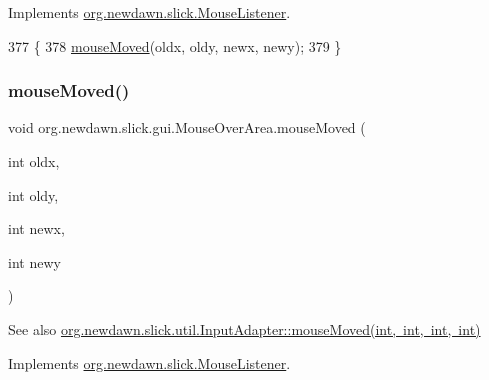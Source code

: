 Implements \mbox{\hyperlink{interfaceorg_1_1newdawn_1_1slick_1_1_mouse_listener_a65022dd6acb492caa47dfd806b207139}{org.\+newdawn.\+slick.\+Mouse\+Listener}}.


\begin{DoxyCode}
377                                                                      \{
378         \mbox{\hyperlink{classorg_1_1newdawn_1_1slick_1_1gui_1_1_mouse_over_area_a3fbca2800bd827846e958116b97d4364}{mouseMoved}}(oldx, oldy, newx, newy);
379     \}
\end{DoxyCode}
\mbox{\label{classorg_1_1newdawn_1_1slick_1_1gui_1_1_mouse_over_area_a3fbca2800bd827846e958116b97d4364}} 
\subsubsection{\texorpdfstring{mouse\+Moved()}{mouseMoved()}}
{\footnotesize\ttfamily void org.\+newdawn.\+slick.\+gui.\+Mouse\+Over\+Area.\+mouse\+Moved (\begin{DoxyParamCaption}\item[{int}]{oldx,  }\item[{int}]{oldy,  }\item[{int}]{newx,  }\item[{int}]{newy }\end{DoxyParamCaption})\hspace{0.3cm}{\ttfamily [inline]}}

\begin{DoxySeeAlso}{See also}
\mbox{\hyperlink{classorg_1_1newdawn_1_1slick_1_1util_1_1_input_adapter_a4ad2eb7dcdd0834b5606e124e41fc9ac}{org.\+newdawn.\+slick.\+util.\+Input\+Adapter\+::mouse\+Moved(int, int, int, int)}} 
\end{DoxySeeAlso}


Implements \mbox{\hyperlink{interfaceorg_1_1newdawn_1_1slick_1_1_mouse_listener_ad41216afc84f2c8d38f91e8b2d46bed9}{org.\+newdawn.\+slick.\+Mouse\+Listener}}.


